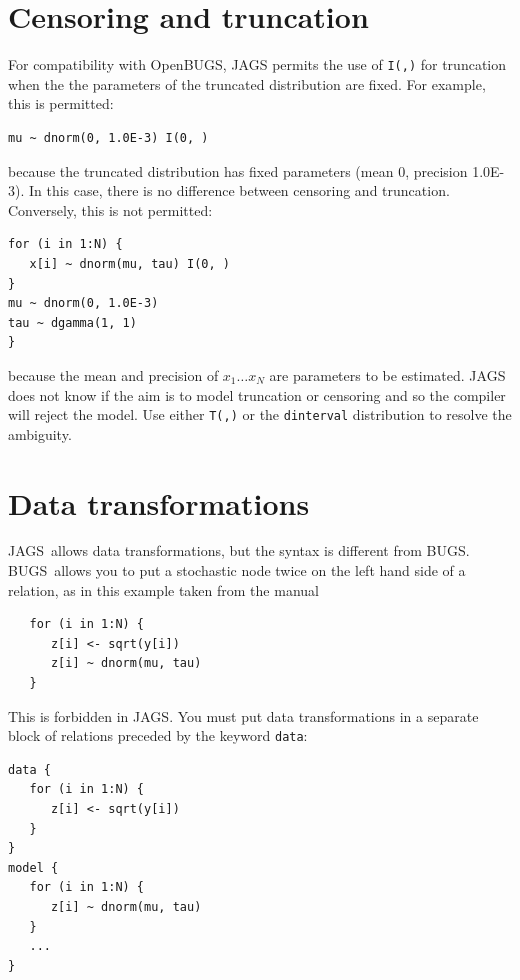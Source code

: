 \documentclass[11pt, a4paper, titlepage]{report}
\newcommand{\JAGS}{\textsf{JAGS}}
\newcommand{\BUGS}{\textsf{BUGS}}
\begin{document}
\section{Censoring and truncation}

For compatibility with OpenBUGS, JAGS permits the use of \texttt{I(,)}
for truncation when the the parameters of the truncated distribution
are fixed.  For example, this is permitted:
\begin{verbatim}
mu ~ dnorm(0, 1.0E-3) I(0, )
\end{verbatim}
because the truncated distribution has fixed parameters (mean 0,
precision 1.0E-3).  In this case, there is no difference between 
censoring and truncation.  Conversely, this is not permitted:
\begin{verbatim}
for (i in 1:N) {
   x[i] ~ dnorm(mu, tau) I(0, )
}
mu ~ dnorm(0, 1.0E-3)
tau ~ dgamma(1, 1)
}
\end{verbatim}
because the mean and precision of $x_1 \dots x_N$ are parameters to be
estimated.  JAGS does not know if the aim is to model truncation or censoring
and so the compiler will reject the model. Use either \texttt{T(,)} or the
\texttt{dinterval} distribution to resolve the ambiguity.

\section{Data transformations}

\JAGS\ allows data transformations, but the syntax is different from
\BUGS.  \BUGS\ allows you to put a stochastic node twice on the left
hand side of a relation, as in this example taken from the manual
\begin{verbatim}
   for (i in 1:N) {
      z[i] <- sqrt(y[i])
      z[i] ~ dnorm(mu, tau)
   }
\end{verbatim}
This is forbidden in \JAGS. You must put data transformations in a 
separate block of relations preceded by the keyword \texttt{data}:
\begin{verbatim}
data {
   for (i in 1:N) {
      z[i] <- sqrt(y[i])
   }
}
model {
   for (i in 1:N) {
      z[i] ~ dnorm(mu, tau)
   }
   ...
}
\end{verbatim}




\end{document}
